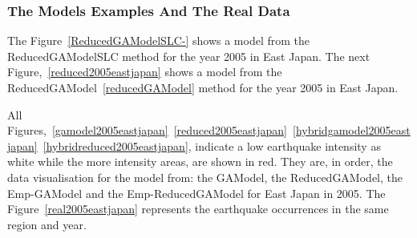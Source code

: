 \subsubsection{The Models Examples And The Real Data}
The Figure~\ref{ReducedGAModelSLC-} shows a model from the ReducedGAModelSLC method for the year 2005 in East Japan. The next Figure,~\ref{reduced2005eastjapan} shows a model from the ReducedGAModel~\ref{reducedGAModel} method for the year 2005 in East Japan.

All Figures,~\ref{gamodel2005eastjapan}~\ref{reduced2005eastjapan}~\ref{hybridgamodel2005eastjapan}~\ref{hybridreduced2005eastjapan},  indicate a low earthquake intensity as white while the more intensity areas, are shown in red. They are, in order, the data visualisation for the model from: the GAModel, the ReducedGAModel, the Emp-GAModel and the Emp-ReducedGAModel for East Japan in 2005. The Figure~\ref{real2005eastjapan} represents the earthquake occurrences in the same region and year.


%
%
%




